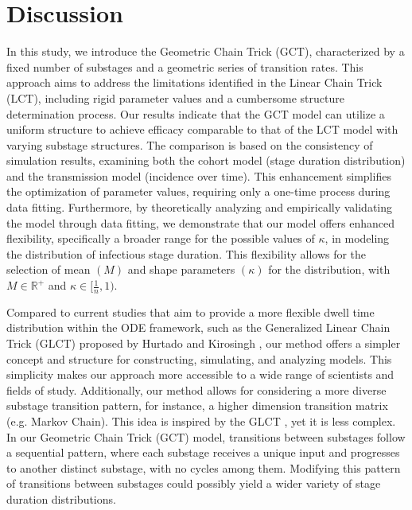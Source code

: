 \documentclass[12pt]{article}
\begin{document}
\section{Discussion}
In this study, we introduce the Geometric Chain Trick (GCT), characterized by a fixed number of substages and a geometric series of transition rates. This approach aims to address the limitations identified in the Linear Chain Trick (LCT), including rigid parameter values and a cumbersome structure determination process. Our results indicate that the GCT model can utilize a uniform structure to achieve efficacy comparable to that of the LCT model with varying substage structures. The comparison is based on the consistency of simulation results, examining both the cohort model (stage duration distribution) and the transmission model (incidence over time). This enhancement simplifies the optimization of parameter values, requiring only a one-time process during data fitting. Furthermore, by theoretically analyzing and empirically validating the model through data fitting, we demonstrate that our model offers enhanced flexibility, specifically a broader range for the possible values of $\kappa$, in modeling the distribution of infectious stage duration. This flexibility allows for the selection of mean $(M)$ and shape parameters $(\kappa)$ for the distribution, with $M \in \mathbb{R}^+$ and $\kappa \in [\frac{1}{n}, 1)$.

Compared to current studies that aim to provide a more flexible dwell time distribution within the ODE framework, such as the Generalized Linear Chain Trick (GLCT) proposed by Hurtado and Kirosingh \cite{hurtado2019generalizations}, our method offers a simpler concept and structure for constructing, simulating, and analyzing models. This simplicity makes our approach more accessible to a wide range of scientists and fields of study. Additionally, our method allows for considering a more diverse substage transition pattern, for instance, a higher dimension transition matrix (e.g. Markov Chain). This idea is inspired by the GLCT \cite{hurtado2019generalizations}\cite{hurtado2021building}, yet it is less complex. In our Geometric Chain Trick (GCT) model, transitions between substages follow a sequential pattern, where each substage receives a unique input and progresses to another distinct substage, with no cycles among them. Modifying this pattern of transitions between substages could possibly yield a wider variety of stage duration distributions.
\end{document}
